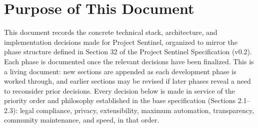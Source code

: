 \chapter*{Purpose of This Document}

This document records the concrete technical stack, architecture, and implementation decisions made for Project Sentinel, organized to mirror the phase structure defined in Section 32 of the Project Sentinel Specification (v0.2). Each phase is documented once the relevant decisions have been finalized. This is a living document: new sections are appended as each development phase is worked through, and earlier sections may be revised if later phases reveal a need to reconsider prior decisions.
Every decision below is made in service of the priority order and philosophy established in the base specification (Sections 2.1–2.3): legal compliance, privacy, extensibility, maximum automation, transparency, community maintenance, and speed, in that order.

\sentinelchapterend
